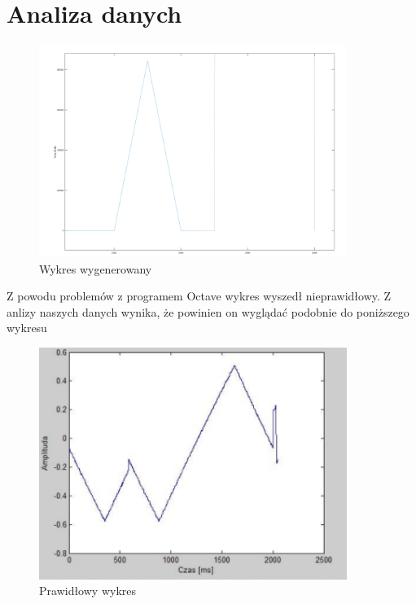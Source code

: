 \documentclass[12pt]{article}
\begin{document}
\section{Analiza danych}
\begin{figure}[!ht]
	\centering 
	\includegraphics[width=10cm]{wykres.PNG}
	\caption{Wykres wygenerowany}
	\label{}
\end{figure}
Z powodu problemów z programem Octave wykres wyszedł nieprawidłowy. Z anlizy naszych danych wynika, że powinien on wyglądać podobnie do poniższego wykresu
\\
\begin{figure}[!ht]
	\centering 
	\includegraphics[width=10cm]{prawidlowy_wykres.PNG}
	\caption{Prawidłowy wykres}
	\label{}
\end{figure}
\end{document}
